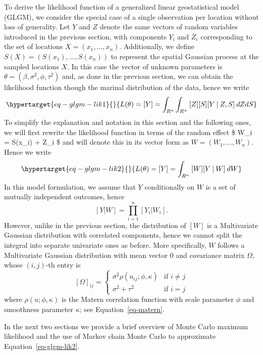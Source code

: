 \documentclass[
  letterpaper,
]{krantz}
\begin{document}
To derive the likelihood function of a generalized linear geostatistical
model (GLGM), we consider the special case of a single observation per
location without loss of generality. Let \(Y\) and \(Z\) denote the same
vectors of random variables introduced in the previous section, with
components \(Y_i\) and \(Z_i\) corresponding to the set of locations
\(X = (x_1, \ldots, x_n)\). Additionally, we define
\(S(X) = (S(x_1), \ldots, S(x_n))\) to represent the spatial Gaussian
process at the sampled locations \(X\). In this case the vector of
unknown parameters is \(\theta = (\beta, \sigma^2, \phi, \tau^2)\) and,
as done in the previous section, we can obtain the likelihood function
though the marinal distribution of the data, hence we write
\begin{equation}\protect\hypertarget{eq-glgm-lik1}{}{
L(\theta) = [Y] = \int_{R^n} \int_{R^n} \: [Z] [S] [Y \:|\: Z, S] \: d Z d S
}\label{eq-glgm-lik1}\end{equation} To simplify the explanation and
notation in this section and the following ones, we will first rewrite
the likelihood function in terms of the random effect \$ W\_i = S(x\_i)
+ Z\_i \$ and will denote this in its vector form as
\(W = (W_1, \ldots, W_n)\). Hence we write
\begin{equation}\protect\hypertarget{eq-glgm-lik2}{}{L(\theta) = [Y] = \int_{R^n} \: [W] [Y \:|\: W] \: d W}\label{eq-glgm-lik2}\end{equation}
In this model formulation, we assume that \(Y\) conditionally on \(W\)
is a set of mutually independent outcomes, hence \[
[Y | W]  = \prod_{i=1}^n [Y_i | W_i].
\] However, unlike in the previous section, the distribution of \([W]\)
is a Multivariate Gaussian distribution with correlated components,
hence we cannot split the integral into separate univariate ones as
before. More specifically, \(W\) follows a Multivariate Gaussian
distribution with mean vector \(0\) and covariance matrix \(\Omega\),
whose \((i, j)\)-th entry is \[
[\Omega]_{ij} = 
\begin{cases}
\sigma^2 \rho(u_{ij}; \phi, \kappa) & \mbox{if }i\neq j \\
\sigma^2 + \tau^2 &  \mbox{if }i = j
\end{cases}
\] where \(\rho(u;\phi,\kappa)\) is the Matern correlation function with
scale parameter \(\phi\) and smoothness parameter \(\kappa\); see
Equation~\ref{eq-matern}.

In the next two sections we provide a brief overview of Monte Carlo
maximum likelihood and the use of Markov chain Monte Carlo to
approximate Equation~\ref{eq-glgm-lik2}.
\end{document}
